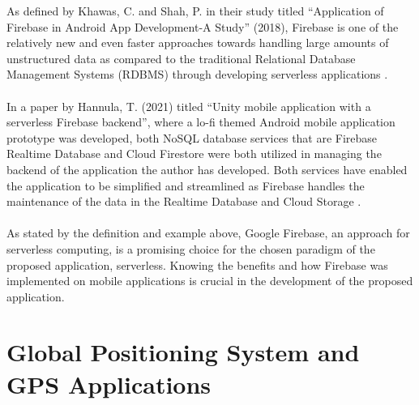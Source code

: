 As defined by Khawas, C. and Shah, P. in their study titled “Application of Firebase in Android App Development-A Study” (2018), Firebase is one of the relatively new and even faster approaches towards handling large amounts of unstructured data as compared to the traditional Relational Database Management Systems (RDBMS) through developing serverless applications 
\cite{khawas2018application}.
\\\\In a paper by Hannula, T. (2021) titled “Unity mobile application with a serverless Firebase backend”, where a lo-fi themed Android mobile application prototype was developed, both NoSQL database services that are Firebase Realtime Database and Cloud Firestore were both utilized in managing the backend of the application the author has developed. Both services have enabled the application to be simplified and streamlined as Firebase handles the maintenance of the data in the Realtime Database and Cloud Storage \cite{hannula2021unity}.
\\\\As stated by the definition and example above, Google Firebase, an approach for serverless computing, is a promising choice for the chosen paradigm of the proposed application, serverless. Knowing the benefits and how Firebase was implemented on mobile applications is crucial in the development of the proposed application.


\section{Global Positioning System and GPS Applications}

